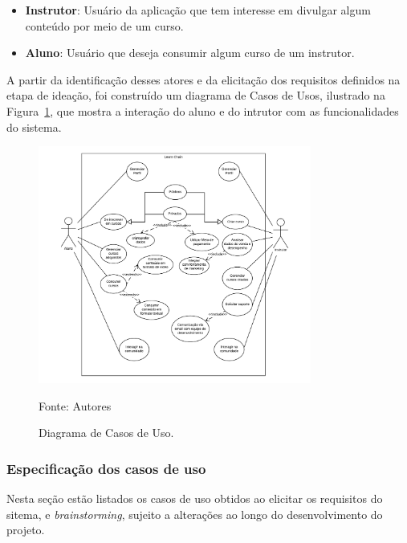         \begin{itemize}
            \item \textbf{Instrutor}: Usuário da aplicação que tem interesse em divulgar algum conteúdo por meio de um curso.
            \item \textbf{Aluno}: Usuário que deseja consumir algum curso de um instrutor.
        \end{itemize}

        A partir da identificação desses atores e da elicitação dos requisitos definidos na etapa de ideação, foi construído um diagrama de Casos de Usos, ilustrado na Figura~\ref{fig:diagrama}, que mostra a interação do aluno e do intrutor com as funcionalidades do sistema.

        \begin{figure}[h]
            \centering
            \caption{Diagrama de Casos de Uso.}
            \includegraphics[width=0.8\textwidth]{figuras/uml.png}
            \begin{center}
                {\footnotesize Fonte: Autores}
            \end{center}
            \label{fig:diagrama}
        \end{figure}
        
        \subsubsection{Especificação dos casos de uso}

        Nesta seção estão listados os casos de uso obtidos ao elicitar os requisitos do sitema, e \textit{brainstorming}, sujeito a alterações ao longo do desenvolvimento do projeto.

